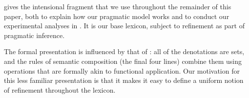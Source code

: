 \documentclass[leqno]{article}
\begin{document}

 gives the intensional fragment that we use
throughout the remainder of this paper, both to explain how our
pragmatic model works and to conduct our experimental analyses in
. It is our base lexicon, subject to
refinement as part of pragmatic inference.

The formal presentation is influenced by that of \citet{Muskens95}:
all of the denotations are sets, and the rules of semantic composition
(the final four lines) combine them using operations that are formally
akin to functional application. Our motivation for this less familiar
presentation is that it makes it easy to define a uniform notion of
refinement throughout the lexicon.
\end{document}

